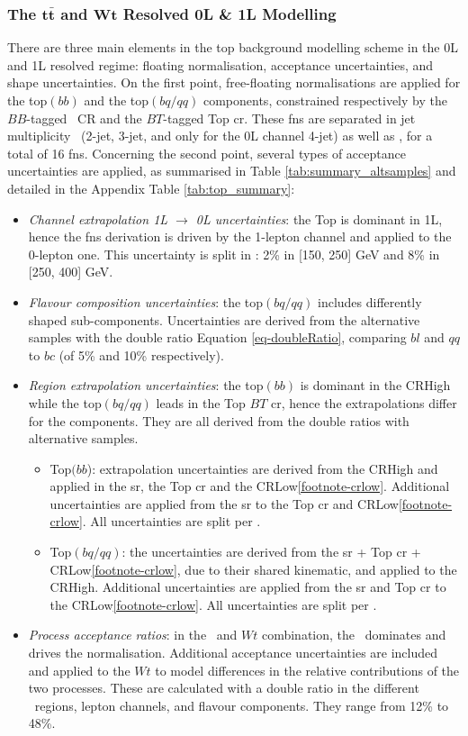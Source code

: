 \subsubsection{The $\boldsymbol{t\bar{t}}$ and $\boldsymbol{Wt}$ Resolved 0L \& 1L Modelling}
There are three main elements in the top background modelling scheme in the 0L and 1L resolved regime: floating normalisation, acceptance uncertainties, and shape uncertainties. On the first point, free-floating normalisations are applied for the top$(bb)$ and the top$(bq/qq)$ components, constrained respectively by the $BB$-tagged \highdr\ CR and the $BT$-tagged Top \gls{cr}. These \gls{fn}s are separated in jet multiplicity \nj\ (2-jet, 3-jet, and only for the 0L channel 4-jet) as well as \ptv, for a total of 16 \gls{fn}s. Concerning the second point, several types of acceptance uncertainties are applied, as summarised in Table \ref{tab:summary_altsamples} and detailed in the Appendix Table \ref{tab:top_summary}:
\begin{itemize}[leftmargin=*]
    \item \textit{Channel extrapolation 1L $\rightarrow$ 0L uncertainties}: the Top is dominant in 1L, hence the \gls{fn}s derivation is driven by the 1-lepton channel and applied to the 0-lepton one. This uncertainty is split in \ptv: 2\% in [150, 250] GeV and 8\% in [250, 400] GeV.
    \item \textit{Flavour composition uncertainties}: the top$(bq/qq)$ includes differently shaped sub-components. Uncertainties are derived from the alternative samples with the double ratio Equation \ref{eq-doubleRatio}, comparing $bl$ and $qq$ to $bc$ (of 5\% and 10\% respectively). 
    \item \textit{Region extrapolation uncertainties}: the top$(bb)$ is dominant in the CRHigh while the top$(bq/qq)$ leads in the Top $BT$ \gls{cr}, hence the extrapolations differ for the components. They are all derived from the double ratios with alternative samples.
    \begin{itemize}
        \item Top$(bb$): extrapolation uncertainties are derived from the CRHigh and applied in the \gls{sr}, the Top \gls{cr} and the CRLow\cref{footnote-crlow}. Additional uncertainties are applied from the \gls{sr} to the Top \gls{cr} and CRLow\cref{footnote-crlow}. All uncertainties are split per \ptv.
        \item Top$(bq/qq)$: the uncertainties are derived from the \gls{sr} + Top \gls{cr} + CRLow\cref{footnote-crlow}, due to their shared kinematic, and applied to the CRHigh. Additional uncertainties are applied from the \gls{sr} and Top \gls{cr} to the CRLow\cref{footnote-crlow}. All uncertainties are split per \ptv.
    \end{itemize}
    \item \textit{Process acceptance ratios}: in the \ttb\ and $Wt$ combination, the \ttb\ dominates and drives the normalisation. Additional acceptance uncertainties are included and applied to the $Wt$ to model differences in the relative contributions of the two processes. These are calculated with a double ratio in the different \ptv\ regions, lepton channels, and flavour components. They range from 12\% to 48\%.
\end{itemize}
